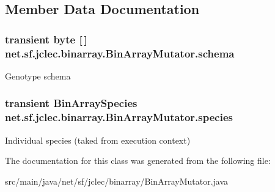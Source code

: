 \subsection{Member Data Documentation}
\hypertarget{classnet_1_1sf_1_1jclec_1_1binarray_1_1_bin_array_mutator_ab89c4bc4bb927685dfb89606bd949808}{
\subsubsection[{schema}]{\setlength{\rightskip}{0pt plus 5cm}transient byte \mbox{[}$\,$\mbox{]} net.\-sf.\-jclec.\-binarray.\-Bin\-Array\-Mutator.\-schema\hspace{0.3cm}{\ttfamily [protected]}}}\label{classnet_1_1sf_1_1jclec_1_1binarray_1_1_bin_array_mutator_ab89c4bc4bb927685dfb89606bd949808}
Genotype schema \hypertarget{classnet_1_1sf_1_1jclec_1_1binarray_1_1_bin_array_mutator_af33a9ab3e0c7729ef86f918c34348080}{
\subsubsection[{species}]{\setlength{\rightskip}{0pt plus 5cm}transient {\bf Bin\-Array\-Species} net.\-sf.\-jclec.\-binarray.\-Bin\-Array\-Mutator.\-species\hspace{0.3cm}{\ttfamily [protected]}}}\label{classnet_1_1sf_1_1jclec_1_1binarray_1_1_bin_array_mutator_af33a9ab3e0c7729ef86f918c34348080}
Individual species (taked from execution context) 

The documentation for this class was generated from the following file\-:\begin{DoxyCompactItemize}
\item 
src/main/java/net/sf/jclec/binarray/Bin\-Array\-Mutator.\-java\end{DoxyCompactItemize}
